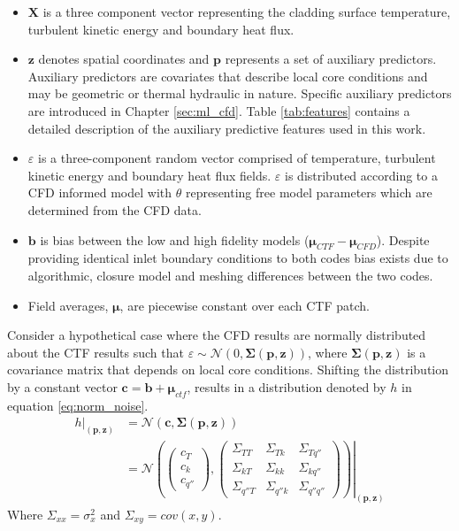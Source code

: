 \begin{itemize}
        \item $\mathbf X$ is a three component vector representing the cladding surface temperature, turbulent kinetic energy and boundary heat flux.
        \item $\mathbf z$ denotes spatial coordinates and $\mathbf p$ represents a set of auxiliary predictors.  Auxiliary predictors are covariates that describe local core conditions and may be geometric or thermal hydraulic in nature.   Specific auxiliary predictors are introduced in Chapter \ref{sec:ml_cfd}.  Table \ref{tab:features} contains a detailed description of the auxiliary predictive features used in this work.
        \item  $\varepsilon$ is a three-component random vector comprised of temperature, turbulent kinetic energy and boundary heat flux fields.  $\varepsilon$ is distributed according to a CFD informed model with $\theta$ representing free model parameters which are determined from the CFD data.
        \item $\bm b$ is bias between the low and high fidelity models ($\bm \mu_{CTF} - \bm \mu_{CFD}$).  Despite providing identical inlet boundary conditions to both codes bias exists due to algorithmic, closure model and meshing differences between the two codes.
        \item Field averages, $\bm \mu$, are piecewise constant over each CTF patch.
\end{itemize}

Consider a hypothetical case where the CFD results are normally distributed about the CTF results such that $\varepsilon \sim \mathcal N(0, \bm \Sigma(\mathbf p, \mathbf z))$, where $ \bm \Sigma(\mathbf p, \mathbf z)$ is a covariance matrix that depends on local core conditions.  Shifting the distribution by a constant vector $\bm c=\bm b + \bm \mu_{ctf}$, results in a distribution denoted by $h$ in equation \ref{eq:norm_noise}.
\begin{align}
    \left. h \right|_{(\bm p, \bm z)} & = \mathcal N(\bm c, \bm \Sigma(\mathbf p, \bm z)) \nonumber \\
    & = \left.
        \mathcal N \left(
        \begin{pmatrix}
            c_T \\
            c_k \\
            c_{q''}
        \end{pmatrix}
    ,
        \begin{pmatrix}
            \Sigma_{TT} & \Sigma_{Tk} & \Sigma_{Tq''} \\
            \Sigma_{kT} & \Sigma_{kk} & \Sigma_{kq''} \\
            \Sigma_{q''T} & \Sigma_{q''k} & \Sigma_{q''q''}
        \end{pmatrix}
    \right)
    \right|_{(\mathbf p, \mathbf z)}
\label{eq:norm_noise}
\end{align}
Where $\Sigma_{xx} = \sigma_x^2$ and $\Sigma_{xy} = cov(x,y)$.

